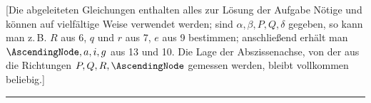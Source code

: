 [Die abgeleiteten Gleichungen enthalten alles zur Lösung der Aufgabe Nötige und können auf vielfältige Weise verwendet werden; sind \(\alpha,\beta,P,Q,\delta\) gegeben, so kann man z.\,B. \(R\) aus 6, \(q\) und \(r\) aus 7, \(e\) aus 9 bestimmen; anschließend erhält man \(\AscendingNode,a,i,g\) aus 13 und 10. Die Lage der Abszissenachse, von der aus die Richtungen \(P,Q,R,\AscendingNode\) gemessen werden, bleibt vollkommen beliebig.]
\begin{center}\rule{.3\linewidth}{.4pt}\end{center}

